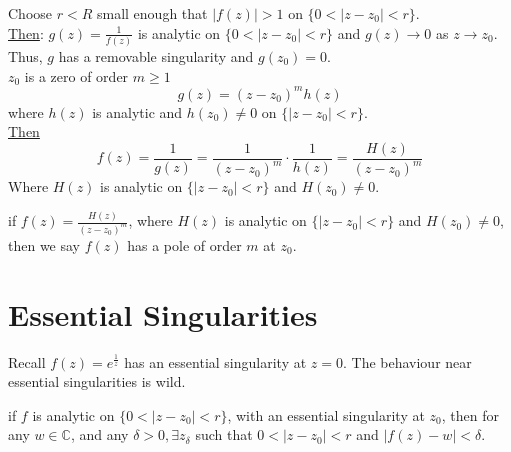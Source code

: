 \begin{lemma}
    [Poles]
    Choose $r < R$ small enough that $|f(z)| > 1$ on $\{0 < |z-z_0| < r \}$. \\
    \underline{Then}: $g(z) = \frac{1}{f(z)}$ is analytic on $\{0 < |z - z_0| < r\}$ and $g(z) \to 0$ as $z \to z_0$. \\
    Thus, $g$ has a removable singularity and $g(z_0) = 0$.\\
    $z_0$ is a zero of order $m \geq 1$
    \begin{equation*}
        g(z) = (z - z_0)^m h(z)
    \end{equation*}
    where $h(z)$ is analytic and $h(z_0) \neq 0$ on $\{|z - z_0| < r\}$. \\
    \underline{Then}
    \begin{equation*}
        f(z) = \frac{1}{g(z)} = \frac{1}{(z - z_0)^m} \cdot \frac{1}{h(z)} = \frac{H(z)}{(z - z_0)^m}
    \end{equation*}
    Where $H(z)$ is analytic on $\{|z-z_0| < r\}$ and $H(z_0) \neq 0$.
\end{lemma}

\begin{definition}
    if $f(z) = \frac{H(z)}{(z - z_0)^m}$, where $H(z)$ is analytic on $\{|z - z_0| < r\}$ and $H(z_0) \neq 0$, then we say $f(z)$ has a pole of order $m$ at $z_0$.
\end{definition}

\section{Essential Singularities}

\begin{remark}
    Recall $f(z) = e^{\frac{1}{z}}$ has an essential singularity at $z = 0$. The behaviour near essential singularities is wild.
\end{remark}

\begin{proposition}
    if $f$ is analytic on $\{0 < |z - z_0| < r\}$, with an essential singularity at $z_0$, then for any $w \in \mathbb{C}$, and any $\delta > 0, \exists z_\delta$ such that $0 < |z - z_0|< r$ and $|f(z) - w| < \delta$.
\end{proposition}
